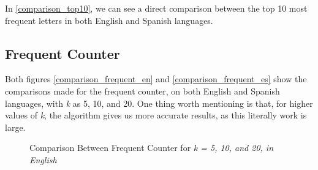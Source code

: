 \documentclass[...]{revdetua}
\begin{document}
In \ref{comparison_top10}, we can see a direct comparison between the top 10 most frequent letters in both English and Spanish languages.

\subsection{Frequent Counter}

Both figures \ref{comparison_frequent_en} and \ref{comparison_frequent_es} show the comparisons made for the frequent counter, on both English and Spanish languages, with \textit{k} as 5, 10, and 20.
One thing worth mentioning is that, for higher values of \textit{k}, the algorithm gives us more accurate results, as this literally work is large.

\begin{figure}[!htb]
    \centering
    \qquad
    \qquad
    \caption{Comparison Between Frequent Counter for \textit{k = 5, 10, and 20, in English}\label{comparison_frequent_en}}%
    \label{fig:example}%
\end{figure}
\end{document}
